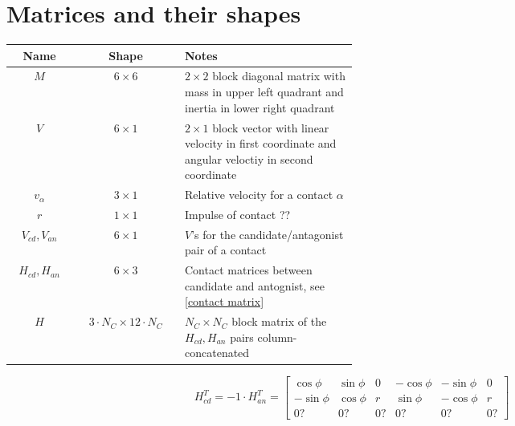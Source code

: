 \documentclass{article}
\begin{document}
\section*{Matrices and their shapes}
\begin{center}
\begin{tabular}{| c | c | p{0.5\linewidth} |}
\hline %
Name & Shape & Notes \\
\hline %
$M$ & $6 \times 6$ & $2 \times 2$ block diagonal matrix with
                     mass in upper left quadrant and
                     inertia in lower right quadrant
                     \\\hline
$V$ & $6 \times 1$ & $2 \times 1$ block vector with
                     linear velocity in first coordinate and
                     angular veloctiy in second coordinate
                     \\\hline
$v_\alpha$ & $3 \times 1$ & Relative velocity for a contact $\alpha$ \\\hline
$r$        & $1 \times 1$ & Impulse of contact ?? \\\hline
$V_{cd}, V_{an}$ & $6 \times 1$ & $V$'s for the candidate/antagonist pair
                                  of a contact \\\hline
$H_{cd}, H_{an}$ & $6 \times 3$ & Contact matrices between candidate and antognist,
                                  see \eqref{contact matrix} \\\hline
$H$ & $3 \cdot N_C \times 12 \cdot N_C$ & $N_C \times N_C$ block matrix
                                          of the $H_{cd}, H_{an}$ pairs column-concatenated \\\hline
\hline %
\end{tabular}
\end{center}

\begin{equation} \label{contact matrix}
H_{cd}^T = -1 \cdot H_{an}^T =
\begin{bmatrix}
\cos \phi  & \sin \phi & 0 & -\cos \phi & -\sin \phi & 0  \\
-\sin \phi & \cos \phi & r & \sin \phi  & -\cos \phi & r \\
0? & 0? & 0? & 0? & 0? & 0?
\end{bmatrix}
\end{equation}
\end{document}
